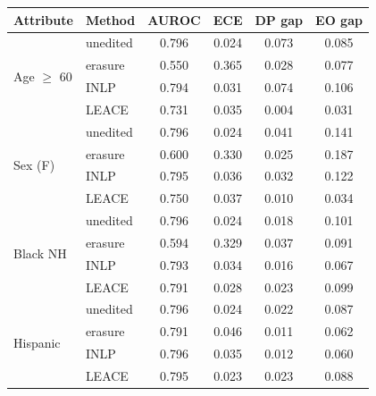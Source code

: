 \begin{tabular}{llcccc}
\toprule
Attribute & Method & AUROC & ECE & DP gap & EO gap \\
\midrule
\multirow{4}{*}{Age $\geq$ 60} & unedited & 0.796 & 0.024 & 0.073 & 0.085 \\
 & erasure & 0.550 & 0.365 & 0.028 & 0.077 \\
 & INLP & 0.794 & 0.031 & 0.074 & 0.106 \\
 & LEACE & 0.731 & 0.035 & 0.004 & 0.031 \\
\midrule
\multirow{4}{*}{Sex (F)} & unedited & 0.796 & 0.024 & 0.041 & 0.141 \\
 & erasure & 0.600 & 0.330 & 0.025 & 0.187 \\
 & INLP & 0.795 & 0.036 & 0.032 & 0.122 \\
 & LEACE & 0.750 & 0.037 & 0.010 & 0.034 \\
\midrule
\multirow{4}{*}{Black NH} & unedited & 0.796 & 0.024 & 0.018 & 0.101 \\
 & erasure & 0.594 & 0.329 & 0.037 & 0.091 \\
 & INLP & 0.793 & 0.034 & 0.016 & 0.067 \\
 & LEACE & 0.791 & 0.028 & 0.023 & 0.099 \\
\midrule
\multirow{4}{*}{Hispanic} & unedited & 0.796 & 0.024 & 0.022 & 0.087 \\
 & erasure & 0.791 & 0.046 & 0.011 & 0.062 \\
 & INLP & 0.796 & 0.035 & 0.012 & 0.060 \\
 & LEACE & 0.795 & 0.023 & 0.023 & 0.088 \\
\bottomrule
\end{tabular}
